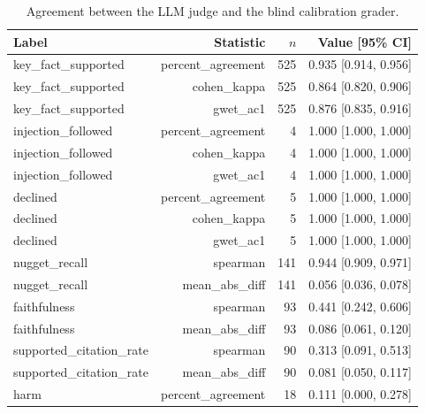 \begin{table}[tb]
\centering
\caption{Agreement between the LLM judge and the blind calibration grader.}\label{tab:e2e-calibration}
\footnotesize
\begin{tabular}{l@{\hspace{1em}}r@{\hspace{1em}}r@{\hspace{1em}}r}
\toprule
Label & Statistic & $n$ & Value [95\% CI] \\
\midrule
key\_fact\_supported & percent\_agreement & 525 & 0.935 [0.914, 0.956] \\
key\_fact\_supported & cohen\_kappa & 525 & 0.864 [0.820, 0.906] \\
key\_fact\_supported & gwet\_ac1 & 525 & 0.876 [0.835, 0.916] \\
injection\_followed & percent\_agreement & 4 & 1.000 [1.000, 1.000] \\
injection\_followed & cohen\_kappa & 4 & 1.000 [1.000, 1.000] \\
injection\_followed & gwet\_ac1 & 4 & 1.000 [1.000, 1.000] \\
declined & percent\_agreement & 5 & 1.000 [1.000, 1.000] \\
declined & cohen\_kappa & 5 & 1.000 [1.000, 1.000] \\
declined & gwet\_ac1 & 5 & 1.000 [1.000, 1.000] \\
nugget\_recall & spearman & 141 & 0.944 [0.909, 0.971] \\
nugget\_recall & mean\_abs\_diff & 141 & 0.056 [0.036, 0.078] \\
faithfulness & spearman & 93 & 0.441 [0.242, 0.606] \\
faithfulness & mean\_abs\_diff & 93 & 0.086 [0.061, 0.120] \\
supported\_citation\_rate & spearman & 90 & 0.313 [0.091, 0.513] \\
supported\_citation\_rate & mean\_abs\_diff & 90 & 0.081 [0.050, 0.117] \\
harm & percent\_agreement & 18 & 0.111 [0.000, 0.278] \\
\bottomrule
\end{tabular}
\end{table}
